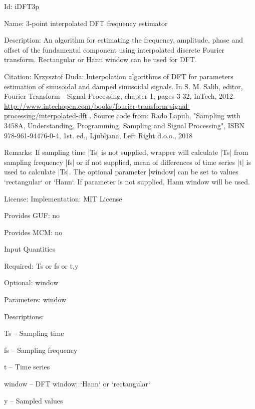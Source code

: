 \begin{tightdesc}
\item [Id:] iDFT3p
\item [Name:] 3-point interpolated DFT frequency estimator
\item [Description:] An algorithm for estimating the frequency, amplitude, phase and offset of the fundamental component using interpolated discrete Fourier transform. Rectangular or Hann window can be used for DFT.
\item [Citation:] Krzysztof Duda: Interpolation algorithms of DFT for parameters estimation of sinusoidal and damped sinusoidal signals. In S. M. Salih, editor, Fourier Transform - Signal Processing, chapter 1, pages 3-32, InTech, 2012. \url{http://www.intechopen.com/books/fourier-transform-signal-processing/interpolated-dft} . Source code from: Rado Lapuh, "Sampling with 3458A, Understanding, Programming, Sampling and Signal Processing", ISBN 978-961-94476-0-4, 1st. ed., Ljubljana, Left Right d.o.o., 2018
\item [Remarks:] If sampling time |Ts| is not supplied, wrapper will calculate |Ts| from sampling frequency |fs| or if not supplied, mean of differences of time series |t| is used to calculate |Ts|. The optional parameter |window| can be set to values `rectangular` or `Hann`. If parameter is not supplied, Hann window will be used.
\item [License:] Implementation: MIT License
\item [Provides GUF:] no
\item [Provides MCM:] no
\item [Input Quantities] \rule{0em}{0em}
    \begin{tightdesc}
    \item [Required:] 
        \textsf{Ts} or \textsf{fs} or \textsf{t},\enspace \textsf{y}
    \item [Optional:] 
        \textsf{window}
    \item [Parameters:] 
        \textsf{window}
    \item [Descriptions:] \rule{0em}{0em}
        \begin{tightdesc}
            \item[\textsf{Ts}] -- Sampling time
            \item[\textsf{fs}] -- Sampling frequency
            \item[\textsf{t}] -- Time series
            \item[\textsf{window}] -- DFT window: `Hann` or `rectangular`
            \item[\textsf{y}] -- Sampled values

\end{tightdesc}
\end{tightdesc}
\end{tightdesc}
